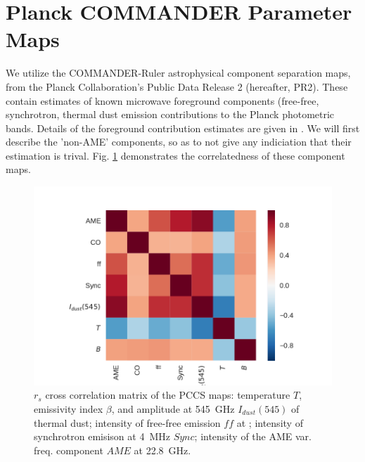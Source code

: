   \section{Planck COMMANDER Parameter Maps}

       We utilize the COMMANDER-Ruler astrophysical component separation maps, from the Planck Collaboration's Public Data Release 2 (hereafter, PR2). These contain estimates of known microwave foreground components (free-free, synchrotron, thermal dust emission contributions to the Planck photometric bands. Details of the foreground contribution estimates are given in \cite{planckXII}. We will first describe the 'non-AME' components, so as to not give any indiciation that their estimation is trival. Fig. \ref{fig:PCCS_corrmatrix} demonstrates the correlatedness of these component maps.

       \begin{figure}
         \label{fig:PCCS_corrmatrix}
         \includegraphics[width=\textwidth]{../Plots/ch_datasources/PCCS_corrmatrix.pdf}
         \centering
         \caption{$r_{s}$ cross correlation matrix of the PCCS maps: temperature $T$, emissivity index $\beta$, and amplitude at 545~GHz $I_{dust}(545)$ of thermal dust; intensity of free-free emission $ff$ at ; intensity of synchrotron emisison at 4~MHz $Sync$; intensity of the AME var. freq. component $AME$ at 22.8~GHz.}
       \end{figure}

